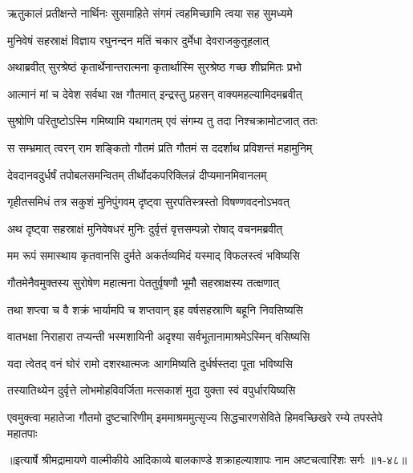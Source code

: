 \twolineshloka
{ऋतुकालं प्रतीक्षन्ते नार्थिनः सुसमाहिते}
{संगमं त्वहमिच्छामि त्वया सह सुमध्यमे} %

\twolineshloka
{मुनिवेषं सहस्राक्षं विज्ञाय रघुनन्दन}
{मतिं चकार दुर्मेधा देवराजकुतूहलात्} %

\twolineshloka
{अथाब्रवीत् सुरश्रेष्ठं कृतार्थेनान्तरात्मना}
{कृतार्थास्मि सुरश्रेष्ठ गच्छ शीघ्रमितः प्रभो} %

\twolineshloka
{आत्मानं मां च देवेश सर्वथा रक्ष गौतमात्}
{इन्द्रस्तु प्रहसन् वाक्यमहल्यामिदमब्रवीत्} %

\twolineshloka
{सुश्रोणि परितुष्टोऽस्मि गमिष्यामि यथागतम्}
{एवं संगम्य तु तदा निश्चक्रामोटजात् ततः} %

\twolineshloka
{स सम्भ्रमात् त्वरन् राम शङ्कितो गौतमं प्रति}
{गौतमं स ददर्शाथ प्रविशन्तं महामुनिम्} %

\twolineshloka
{देवदानवदुर्धर्षं तपोबलसमन्वितम्}
{तीर्थोदकपरिक्लिन्नं दीप्यमानमिवानलम्} %

\twolineshloka
{गृहीतसमिधं तत्र सकुशं मुनिपुंगवम्}
{दृष्ट्वा सुरपतिस्त्रस्तो विषण्णवदनोऽभवत्} %

\twolineshloka
{अथ दृष्ट्वा सहस्राक्षं मुनिवेषधरं मुनिः}
{दुर्वृत्तं वृत्तसम्पन्नो रोषाद् वचनमब्रवीत्} %

\twolineshloka
{मम रूपं समास्थाय कृतवानसि दुर्मते}
{अकर्तव्यमिदं यस्माद् विफलस्त्वं भविष्यसि} %

\twolineshloka
{गौतमेनैवमुक्तस्य सुरोषेण महात्मना}
{पेततुर्वृषणौ भूमौ सहस्राक्षस्य तत्क्षणात्} %

\twolineshloka
{तथा शप्त्वा च वै शक्रं भार्यामपि च शप्तवान्}
{इह वर्षसहस्राणि बहूनि निवसिष्यसि} %

\twolineshloka
{वातभक्षा निराहारा तप्यन्ती भस्मशायिनी}
{अदृश्या सर्वभूतानामाश्रमेऽस्मिन् वसिष्यसि} %

\twolineshloka
{यदा त्वेतद् वनं घोरं रामो दशरथात्मजः}
{आगमिष्यति दुर्धर्षस्तदा पूता भविष्यसि} %

\twolineshloka
{तस्यातिथ्येन दुर्वृत्ते लोभमोहविवर्जिता}
{मत्सकाशं मुदा युक्ता स्वं वपुर्धारयिष्यसि} %

\threelineshloka
{एवमुक्त्वा महातेजा गौतमो दुष्टचारिणीम्}
{इममाश्रममुत्सृज्य सिद्धचारणसेविते}
{हिमवच्छिखरे रम्ये तपस्तेपे महातपाः} %


॥इत्यार्षे श्रीमद्रामायणे वाल्मीकीये आदिकाव्ये बालकाण्डे शक्राहल्याशापः नाम अष्टचत्वारिंशः सर्गः ॥१-४८॥
